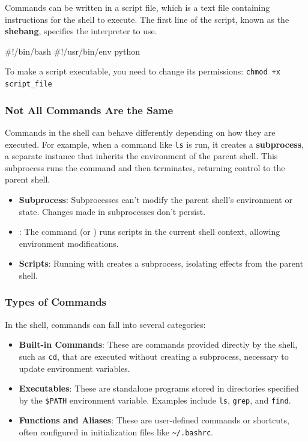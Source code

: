 Commands can be written in a script file, which is a text file containing instructions for the shell to execute. 
The first line of the script, known as the \textbf{shebang}, specifies the interpreter to use.

\begin{codeblock}[language=bash, numbers=none]
#!/bin/bash
#!/usr/bin/env python
\end{codeblock}

To make a script executable, you need to change its permissions:
\texttt{chmod +x script\_file}

\subsubsection{Not All Commands Are the Same}

Commands in the shell can behave differently depending on how they are executed. For example, when a command like \texttt{ls} is run, it creates a \textbf{subprocess}, a separate instance that inherits the environment of the parent shell. This subprocess runs the command and then terminates, returning control to the parent shell.

\begin{tipsblock}
    \begin{itemize}
        \item \textbf{Subprocess}: Subprocesses can't modify the parent shell's environment or state. Changes made in subprocesses don't persist.
        \item \textbf{}: The  command (or ) runs scripts in the current shell context, allowing environment modifications.
        \item \textbf{Scripts}: Running with  creates a subprocess, isolating effects from the parent shell.
    \end{itemize}
\end{tipsblock}

\subsubsection{Types of Commands}

In the shell, commands can fall into several categories:

\begin{itemize}
    \item \textbf{Built-in Commands}: These are commands provided directly by the shell, such as \texttt{cd}, that are executed without creating a subprocess, necessary to update environment variables.
    \item \textbf{Executables}: These are standalone programs stored in directories specified by the \texttt{\$PATH} environment variable. Examples include \texttt{ls}, \texttt{grep}, and \texttt{find}.
    \item \textbf{Functions and Aliases}: These are user-defined commands or shortcuts, often configured in initialization files like \texttt{\textasciitilde/.bashrc}.
\end{itemize}


